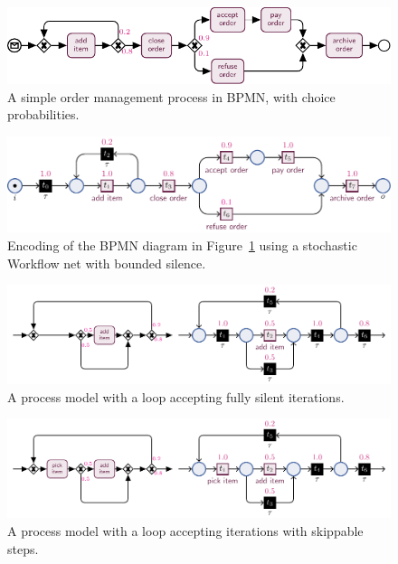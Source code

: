 
\begin{figure}[!t]
	\centering
	\includegraphics[width=.8\textwidth]{images/bpmn-order}
	\caption{A simple order management process in BPMN, with choice probabilities.}\label{fig:bpmn-order}
\end{figure}
\begin{figure}[!t]
		\centering
	\includegraphics[width=.9\textwidth]{images/petri_order}
	\caption{Encoding of the BPMN diagram in Figure~\ref{fig:bpmn-order} using a stochastic Workflow net with bounded silence.}\label{fig:petri_tut}
\end{figure}
\begin{figure}[!t]
	\centering
	\includegraphics[width=1.0\textwidth]{images/skip-iteration}
	\caption{A process model with a loop accepting fully silent iterations.}\label{fig:skip-iteration}
\end{figure}
\begin{figure}[!t]
	\centering
	\includegraphics[width=1.0\textwidth]{images/skip-step}
	\caption{A process model with a loop accepting iterations with skippable steps.}\label{fig:skip-step}
\end{figure}

